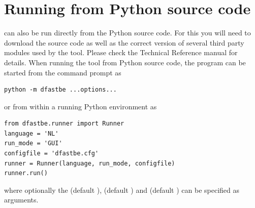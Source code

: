 \section{Running from Python source code} \label{Sec:Python}
\dfastbe can also be run directly from the Python source code.
For this you will need to download the source code as well as the correct version of several third party modules used by the tool.
Please check the \dfastbe Technical Reference manual for details.
When running the tool from Python source code, the program can be started from the command prompt as

\begin{Verbatim}
python -m dfastbe ...options...
\end{Verbatim}

or from within a running Python environment as

\begin{Verbatim}
from dfastbe.runner import Runner
language = 'NL'
run_mode = 'GUI'
configfile = 'dfastbe.cfg'
runner = Runner(language, run_mode, configfile)
runner.run()
\end{Verbatim}

where optionally the  (default ),  (default )
and  (default ) can be specified as arguments.